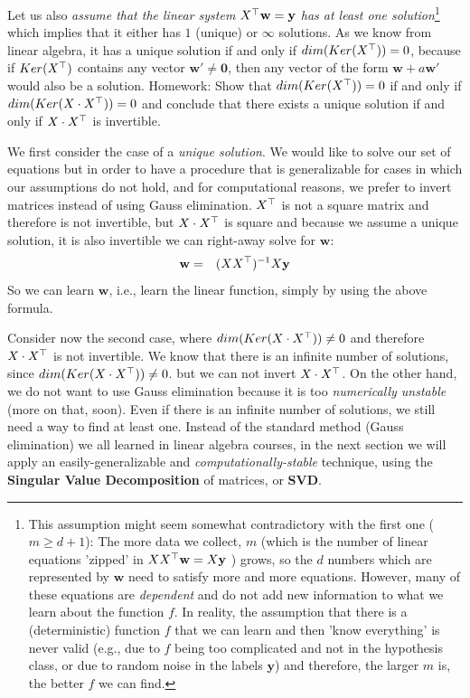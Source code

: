 Let us also \textit{assume that the linear system $X^{\top} \mathbf{w}=\mathbf{y}$ has at least one solution}\footnote{This assumption might seem somewhat contradictory with the first one ($m\geq d+1$): The more data we collect, $m$ (which is the number of linear equations 'zipped' in $XX^{\top} \mathbf{w}=X\mathbf{y}$ ) grows, so the $d$ numbers which are represented by $\mathbf{w}$ need to satisfy more and more equations. However, many of these equations are \emph{dependent} and do not add new information to what we learn about the function $f$. In reality, the assumption that there is a (deterministic) function $f$ that we can learn and then 'know everything' is never valid (e.g., due to $f$ being too complicated and not in the hypothesis class, or due to random noise in the labels $\mathbf{y}$) and therefore, the larger $m$ is, the better $\hat{f}$ we can find.}
which implies that it either has $1$ (unique) or $\infty$ solutions. As we know from linear algebra, it has a unique solution if and only if $dim(Ker(X^{\top}))=0$, because if $Ker(X^{\top})$ contains any vector $\mathbf{w}'\neq \mathbf{0}$, then any vector of the form $\mathbf{w}+a\mathbf{w}'$ would also be a solution.
\vspace{3mm}
Homework: Show that $dim(Ker(X^{\top}))=0$ if and only if $dim(Ker(X\cdot X^{\top}))=0$ and conclude that there exists a unique solution if and only if $X\cdot X^{\top}$ is invertible.
\vspace{3mm}


We first consider the case of a \textit{unique solution}. We would like to solve our set of equations but in order to have a procedure that is generalizable for cases in which our assumptions do not hold, and for computational reasons,  we prefer to invert matrices instead of using Gauss elimination.
$X^{\top}$ is not a square matrix and therefore is not invertible, but $X\cdot X^{\top}$ is square and because we assume a unique solution, it is also invertible we can right-away solve for $\mathbf{w}$:
\begin{eqnarray*}
  \mathbf{w} &=&  (X X^{\top})^{-1}X\mathbf{y}
\end{eqnarray*}
So we can  learn $\mathbf{w}$, i.e., learn the linear function, simply by using the above formula.

Consider now the second case, where $dim(Ker(X\cdot X^{\top}))\neq 0$  and therefore $X\cdot X^{\top}$ is not invertible. We
 know that there is an infinite number of solutions,  since $dim(Ker(X\cdot X^{\top}))\neq 0$.
but we can not invert $X\cdot X^{\top}$. On the other hand, we do not want to use Gauss elimination because it is too \textit{numerically unstable} (more on that, soon).
Even if there is an infinite number of solutions, we still need a way to find at least one. Instead of the standard method (Gauss elimination) we all learned in linear algebra courses, in the next section we will apply an easily-generalizable and \textit{computationally-stable} technique, using the \textbf{Singular Value Decomposition} of matrices, or \textbf{SVD}.


